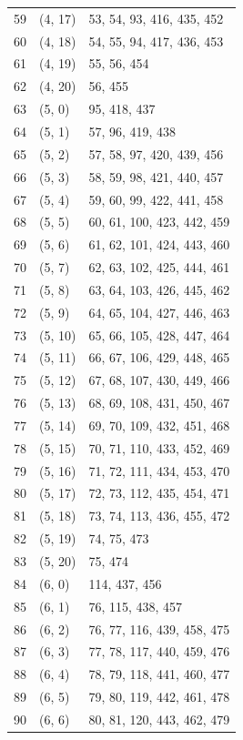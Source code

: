 \documentclass{article}
\begin{document}
\begin{longtable}{lll}
  59 & (4, 17) & 53, 54, 93, 416, 435, 452 \\
  60 & (4, 18) & 54, 55, 94, 417, 436, 453 \\
  61 & (4, 19) & 55, 56, 454 \\
  62 & (4, 20) & 56, 455 \\
  63 & (5, 0) & 95, 418, 437 \\
  64 & (5, 1) & 57, 96, 419, 438 \\
  65 & (5, 2) & 57, 58, 97, 420, 439, 456 \\
  66 & (5, 3) & 58, 59, 98, 421, 440, 457 \\
  67 & (5, 4) & 59, 60, 99, 422, 441, 458 \\
  68 & (5, 5) & 60, 61, 100, 423, 442, 459 \\
  69 & (5, 6) & 61, 62, 101, 424, 443, 460 \\
  70 & (5, 7) & 62, 63, 102, 425, 444, 461 \\
  71 & (5, 8) & 63, 64, 103, 426, 445, 462 \\
  72 & (5, 9) & 64, 65, 104, 427, 446, 463 \\
  73 & (5, 10) & 65, 66, 105, 428, 447, 464 \\
  74 & (5, 11) & 66, 67, 106, 429, 448, 465 \\
  75 & (5, 12) & 67, 68, 107, 430, 449, 466 \\
  76 & (5, 13) & 68, 69, 108, 431, 450, 467 \\
  77 & (5, 14) & 69, 70, 109, 432, 451, 468 \\
  78 & (5, 15) & 70, 71, 110, 433, 452, 469 \\
  79 & (5, 16) & 71, 72, 111, 434, 453, 470 \\
  80 & (5, 17) & 72, 73, 112, 435, 454, 471 \\
  81 & (5, 18) & 73, 74, 113, 436, 455, 472 \\
  82 & (5, 19) & 74, 75, 473 \\
  83 & (5, 20) & 75, 474 \\
  84 & (6, 0) & 114, 437, 456 \\
  85 & (6, 1) & 76, 115, 438, 457 \\
  86 & (6, 2) & 76, 77, 116, 439, 458, 475 \\
  87 & (6, 3) & 77, 78, 117, 440, 459, 476 \\
  88 & (6, 4) & 78, 79, 118, 441, 460, 477 \\
  89 & (6, 5) & 79, 80, 119, 442, 461, 478 \\
  90 & (6, 6) & 80, 81, 120, 443, 462, 479 \\

\end{longtable}
\end{document}
